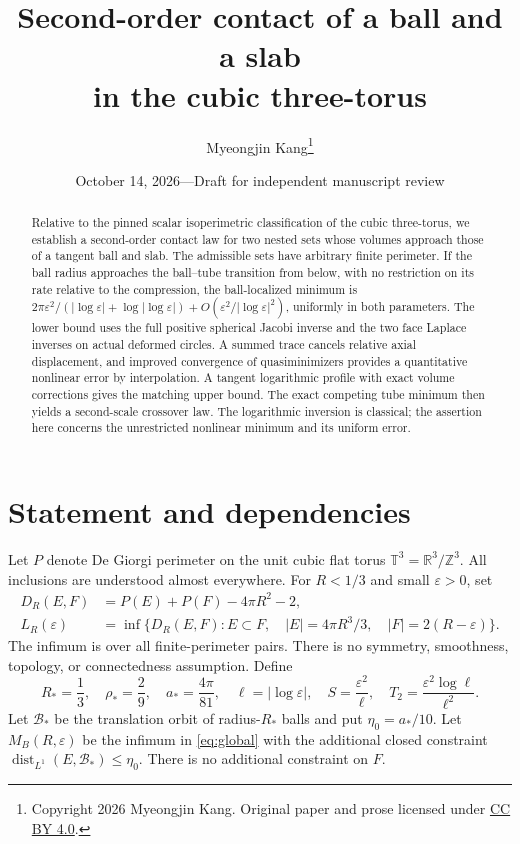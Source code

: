 \documentclass[11pt]{article}
\title{Second-order contact of a ball and a slab\texorpdfstring{\\}{ }in the cubic three-torus}
\author{Myeongjin Kang\thanks{Copyright 2026 Myeongjin Kang. Original paper and prose licensed under \href{https://creativecommons.org/licenses/by/4.0/}{CC BY 4.0}.}}
\date{October 14, 2026\quad---\quad Draft for independent manuscript review}
\newcommand{\T}{\mathbb T}
\newcommand{\R}{\mathbb R}
\newcommand{\eps}{\varepsilon}
\newcommand{\dist}{\operatorname{dist}}
\theoremstyle{remark}\newtheorem{remark}[theorem]{Remark}
\numberwithin{equation}{section}
\begin{document}
\maketitle
\begin{abstract}
Relative to the pinned scalar isoperimetric classification of the cubic
three-torus, we establish a second-order contact law for two nested sets
whose volumes approach those of a tangent ball and slab. The admissible
sets have arbitrary finite perimeter. If the ball radius approaches the
ball--tube transition from below, with no restriction on its rate relative
to the compression, the ball-localized minimum is
$2\pi\eps^2/(|\log\eps|+\log|\log\eps|)
+O(\eps^2/|\log\eps|^2)$, uniformly in both parameters.
The lower bound uses the full positive spherical Jacobi inverse and the
two face Laplace inverses on actual deformed circles. A summed trace cancels
relative axial displacement, and improved convergence of quasiminimizers
provides a quantitative nonlinear error by interpolation. A tangent
logarithmic profile with exact volume corrections gives the matching upper
bound. The exact competing tube minimum then yields a second-scale
crossover law. The logarithmic inversion is classical; the assertion here
concerns the unrestricted nonlinear minimum and its uniform error.
\end{abstract}

\section{Statement and dependencies}\label{sec:statement}
Let $P$ denote De Giorgi perimeter on the unit cubic flat torus
$\T^3=\R^3/\mathbb Z^3$. All inclusions are understood almost everywhere.
For $R<1/3$ and small $\eps>0$, set
\begin{align}
 D_R(E,F)&=P(E)+P(F)-4\pi R^2-2,\\
 L_R(\eps)&=\inf\{D_R(E,F):E\subset F,\quad
 |E|=4\pi R^3/3,\quad |F|=2(R-\eps)\}.\label{eq:global}
\end{align}
The infimum is over all finite-perimeter pairs. There is no symmetry,
smoothness, topology, or connectedness assumption. Define
\[
 R_*=\frac13,\quad \rho_*=\frac29,\quad a_*=\frac{4\pi}{81},
 \quad \ell=|\log\eps|,\quad S=\frac{\eps^2}{\ell},
 \quad T_2=\frac{\eps^2\log\ell}{\ell^2}.
\]
Let $\mathcal B_*$ be the translation orbit of radius-$R_*$ balls and put
$\eta_0=a_*/10$. Let $M_B(R,\eps)$ be the infimum in
\eqref{eq:global} with the additional closed constraint
$\dist_{L^1}(E,\mathcal B_*)\leq\eta_0$. There is no additional
constraint on $F$.
\end{document}
